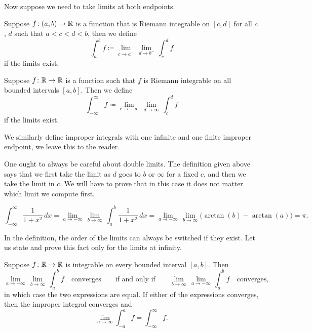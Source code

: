 Now suppose we need to take limits at both endpoints.

\begin{defn}
Suppose $f \colon (a,b) \to {\mathbb{R}}$ is a function
that is Riemann integrable on $[c,d]$ for all $c$, $d$
such that $a < c < d < b$, then we define
\begin{equation*}
\int_a^b f \coloneqq \lim_{c \to a^+} \, \lim_{d \to b^-} \, \int_{c}^{d} f
\end{equation*}
if the limits exist.

Suppose $f \colon {\mathbb{R}} \to {\mathbb{R}}$ is a function such that
$f$ is Riemann integrable on all bounded intervals $[a,b]$.  Then
we define
\begin{equation*}
\int_{-\infty}^\infty f \coloneqq \lim_{c \to -\infty} \, \lim_{d \to \infty} \, \int_c^d f
\end{equation*}
if the limits exist.

We similarly define improper integrals with one infinite and one finite
improper endpoint, we leave this to the reader.
\end{defn}

One ought to always be careful about double limits.  The definition
given above says that we first take the limit as $d$ goes to $b$ or
$\infty$ for a fixed $c$, and then we take the limit in $c$.
We will have to prove that in this case it does not matter which limit
we compute first.

\begin{example}
\begin{equation*}
\int_{-\infty}^\infty \frac{1}{1+x^2} \, dx
=
\lim_{a \to -\infty} \, \lim_{b \to \infty} \,
\int_{a}^b \frac{1}{1+x^2} \, dx
=
\lim_{a \to -\infty} \, \lim_{b \to \infty}
\bigl( \arctan(b) - \arctan(a) \bigr)
=
\pi .
\end{equation*}
\end{example}

In the definition, the order of the limits can always be switched if they
exist.  Let us state and prove this fact only for the limits at infinity.

\begin{prop}
Suppose $f \colon {\mathbb{R}} \to {\mathbb{R}}$ is integrable on every bounded interval
$[a,b]$.
Then 
\begin{equation*}
\lim_{a \to -\infty} \, \lim_{b \to \infty} \, \int_a^b f
\quad \text{converges} \qquad \text{if and only if} \qquad
\lim_{b \to \infty}
\,
\lim_{a \to -\infty}
\,
\int_a^b f
\quad
\text{converges,}
\end{equation*}
in which case the two
expressions are equal.  If either of the
expressions converges, then the improper integral converges and
\begin{equation*}
\lim_{a\to\infty}
\int_{-a}^a f
=
\int_{-\infty}^\infty f .
\end{equation*}
\end{prop}

